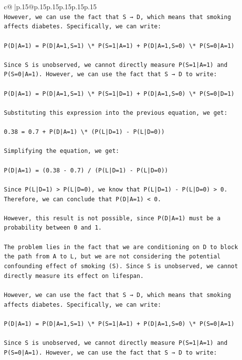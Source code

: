 \documentclass{article}
\begin{document}
{\begin{supertabular}{c@{$\;$}|p{.15\linewidth}@{}p{.15\linewidth}p{.15\linewidth}p{.15\linewidth}p{.15\linewidth}p{.15\linewidth}}
{{{\\ 
\texttt{However, we can use the fact that S → D, which means that smoking affects diabetes. Specifically, we can write:} \\
\\ 
\texttt{P(D|A=1) = P(D|A=1,S=1) \textbackslash{}* P(S=1|A=1) + P(D|A=1,S=0) \textbackslash{}* P(S=0|A=1)} \\
\\ 
\texttt{Since S is unobserved, we cannot directly measure P(S=1|A=1) and P(S=0|A=1). However, we can use the fact that S → D to write:} \\
\\ 
\texttt{P(D|A=1) = P(D|A=1,S=1) \textbackslash{}* P(S=1|D=1) + P(D|A=1,S=0) \textbackslash{}* P(S=0|D=1)} \\
\\ 
\texttt{Substituting this expression into the previous equation, we get:} \\
\\ 
\texttt{0.38 = 0.7 + P(D|A=1) \textbackslash{}* (P(L|D=1) {-} P(L|D=0))} \\
\\ 
\texttt{Simplifying the equation, we get:} \\
\\ 
\texttt{P(D|A=1) = (0.38 {-} 0.7) / (P(L|D=1) {-} P(L|D=0))} \\
\\ 
\texttt{Since P(L|D=1) > P(L|D=0), we know that P(L|D=1) {-} P(L|D=0) > 0. Therefore, we can conclude that P(D|A=1) < 0.} \\
\\ 
\texttt{However, this result is not possible, since P(D|A=1) must be a probability between 0 and 1.} \\
\\ 
\texttt{The problem lies in the fact that we are conditioning on D to block the path from A to L, but we are not considering the potential confounding effect of smoking (S). Since S is unobserved, we cannot directly measure its effect on lifespan.} \\
\\ 
\texttt{However, we can use the fact that S → D, which means that smoking affects diabetes. Specifically, we can write:} \\
\\ 
\texttt{P(D|A=1) = P(D|A=1,S=1) \textbackslash{}* P(S=1|A=1) + P(D|A=1,S=0) \textbackslash{}* P(S=0|A=1)} \\
\\ 
\texttt{Since S is unobserved, we cannot directly measure P(S=1|A=1) and P(S=0|A=1). However, we can use the fact that S → D to write:} \\
}}}
\end{supertabular}}
\end{document}
